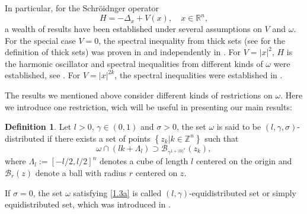 \documentclass{article}
\numberwithin{equation}{section}
\newcommand\R{\ensuremath{\mathbb{R}}}
\newcommand\Z{\ensuremath{\mathbb{Z}}}
\numberwithin{equation}{section}
\theoremstyle{definition}
\newtheorem{definition}{Definition}[section]
\begin{document}
In particular, for the Schröidnger operator
\[
H=-\Delta_x +V(x),\quad  x \in \R^{n},
\] 
a wealth of results have been established under several assumptions on $V$ and  $\omega$. For the special case $V=0$, the spectral inequality from thick sets (see \cite{wang2019observable,kovrijkine2001some} for the definition of thick sets) was proven in \cite{wang2019observable} and independently in \cite{egidi2018sharp}.  For $V=|x|^2$, $H$ is the harmonic oscillator and spectral inequalities from different kinds of $\omega$ were established, see \cite{beauchard2018null,beauchard2021spectral,egidi2021abstract,martin2022spectral,dicke2023uncertainty}. For $V=|x|^{2k}$, the spectral inequalities were established in \cite{alphonse2023quantitative,alphonse2020null,martin2022spectral}. 

The results we mentioned above consider different kinds of restrictions on $\omega$. Here we introduce one restriction, wich will be useful in presenting our main results:
\begin{definition}
	Let $l>0$, $\gamma \in (0,1)$ and $\sigma >0$, the set $\omega$ is said to be $(l,\gamma,\sigma)$-distributed if there exists a set of points $\left\{z_k\lvert k\in \Z^{n}\right\} $ such that
	\begin{equation}\label{1.3a}
		\omega \cap (lk+\Lambda_l)\supset \mathcal{B}_{\gamma^{1+|lk|^{\sigma }}}(z_k),
	\end{equation}
	where $\Lambda_l:= \left[ -l /2,l /2 \right]^{n} $ denotes a cube of length $l$ centered on the origin and  $\mathcal{B}_r(z)$ denote a ball with radius $r$ centered on $z$.
\end{definition}
If $\sigma =0$, the set $\omega$ satisfying \eqref{1.3a} is called $(l,\gamma)$-equidistributed set or simply equidistributed set, which was introduced in \cite{rojas2013scale}.
\end{document}
